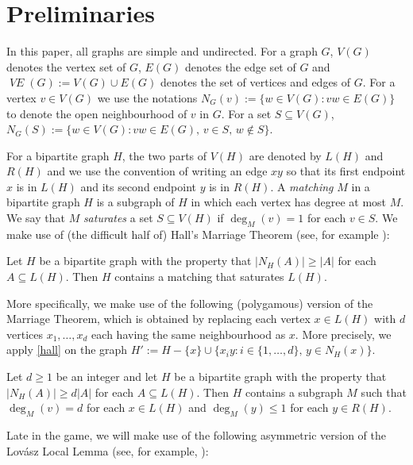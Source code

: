 \documentclass{patmorin}
\newcommand{\defin}[1]{\emph{\color{brown}#1}}
\DeclareMathOperator{\VE}{\mathit{VE}}
\begin{document}
\section{Preliminaries}

In this paper, all graphs are simple and undirected. For a graph $G$, $V(G)$ denotes the vertex set of $G$, $E(G)$ denotes the edge set of $G$ and $\VE(G):=V(G)\cup E(G)$ denotes the set of vertices and edges of $G$. For a vertex $v\in V(G)$ we use the notations $N_G(v):=\{w\in V(G):vw\in E(G)\}$  to denote the open neighbourhood of $v$ in $G$.  For a set $S\subseteq V(G)$, $N_G(S):=\{w\in V(G):vw\in E(G),\, v\in S,\, w\not\in S\}$.

For a  bipartite graph $H$, the two parts of $V(H)$ are denoted by $L(H)$ and $R(H)$ and we use the convention of writing an edge $xy$ so that its first endpoint $x$ is in $L(H)$ and its second endpoint $y$ is in $R(H)$.  A \defin{matching} $M$ in a bipartite graph $H$ is a subgraph of $H$ in which each vertex has degree at most $M$.  We say that $M$ \defin{saturates} a set $S\subseteq V(H)$ if $\deg_M(v)=1$ for each $v\in S$.  We make use of (the difficult half of) Hall's Marriage Theorem (see, for example \citet[Theorem~2.1.2]{diestel:graph}):

\begin{thm}\label{hall}
  Let $H$ be a bipartite graph with the property that $|N_H(A)|\ge |A|$ for each $A\subseteq L(H)$.  Then $H$ contains a matching that saturates $L(H)$.
\end{thm}

More specifically, we make use of the following (polygamous) version of the Marriage Theorem, which is obtained by replacing each vertex $x\in L(H)$ with $d$ vertices $x_1,\ldots,x_d$ each having the same neighbourhood as $x$.  More precisely, we apply \cref{hall} on the graph $H':=H-\{x\}\cup\{x_iy:i\in\{1,\ldots,d\},\, y\in N_H(x)\}$.

\begin{cor}\label{d_hall}
  Let $d\ge 1$ be an integer and let $H$ be a bipartite graph with the property that $|N_H(A)|\ge d|A|$ for each $A\subseteq L(H)$.  Then $H$ contains a subgraph $M$ such that $\deg_M(v)=d$ for each $x\in L(H)$ and $\deg_M(y)\le 1$ for each $y\in R(H)$.
\end{cor}

Late in the game, we will make use of the following asymmetric version of the Lovász Local Lemma (see, for example, \citet[Lemma~5.1.1]{alon.spencer:probabilistic}):
\end{document}
